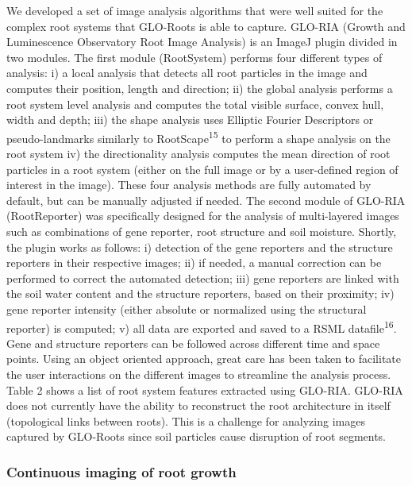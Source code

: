 \documentclass[]{article}
\begin{document}
We developed a set of image analysis algorithms that were well suited
for the complex root systems that GLO-Roots is able to capture. GLO-RIA
(Growth and Luminescence Observatory Root Image Analysis) is an ImageJ
plugin divided in two modules. The first module (RootSystem) performs
four different types of analysis: i) a local analysis that detects all
root particles in the image and computes their position, length and
direction; ii) the global analysis performs a root system level analysis
and computes the total visible surface, convex hull, width and depth;
iii) the shape analysis uses Elliptic Fourier Descriptors or
pseudo-landmarks similarly to RootScape\textsuperscript{15} to perform a
shape analysis on the root system iv) the directionality analysis
computes the mean direction of root particles in a root system (either
on the full image or by a user-defined region of interest in the image).
These four analysis methods are fully automated by default, but can be
manually adjusted if needed. The second module of GLO-RIA (RootReporter)
was specifically designed for the analysis of multi-layered images such
as combinations of gene reporter, root structure and soil moisture.
Shortly, the plugin works as follows: i) detection of the gene reporters
and the structure reporters in their respective images; ii) if needed, a
manual correction can be performed to correct the automated detection;
iii) gene reporters are linked with the soil water content and the
structure reporters, based on their proximity; iv) gene reporter
intensity (either absolute or normalized using the structural reporter)
is computed; v) all data are exported and saved to a RSML
datafile\textsuperscript{16}. Gene and structure reporters can be
followed across different time and space points. Using an object
oriented approach, great care has been taken to facilitate the user
interactions on the different images to streamline the analysis process.
Table 2 shows a list of root system features extracted using GLO-RIA.
GLO-RIA does not currently have the ability to reconstruct the root
architecture in itself (topological links between roots). This is a
challenge for analyzing images captured by GLO-Roots since soil
particles cause disruption of root segments.

\subsubsection{Continuous imaging of root
growth}\label{continuous-imaging-of-root-growth}
\end{document}
